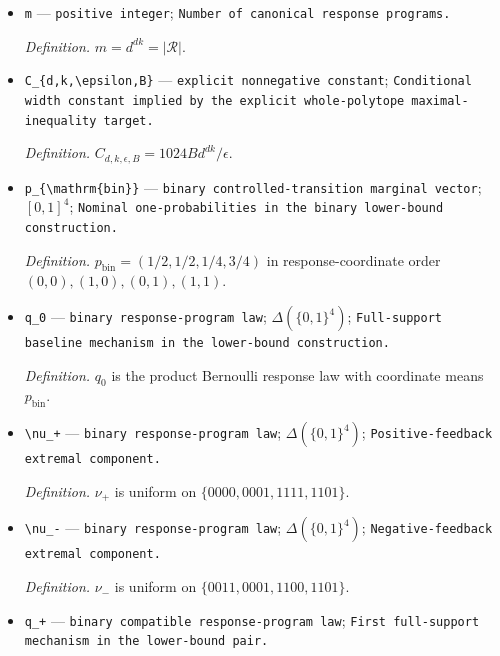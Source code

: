\documentclass{article}
\begin{document}
\begin{itemize}
  \item \texttt{m} --- \texttt{positive integer}; \texttt{Number of canonical response programs.}
  \par\smallskip\noindent\emph{Definition.} \(m=d^{dk}=|\mathcal R|\).
  \item \texttt{C\_\allowbreak{}\{d,\allowbreak{}k,\allowbreak{}\textbackslash{}\allowbreak{}epsilon,\allowbreak{}B\}\allowbreak{}} --- \texttt{explicit nonnegative constant}; \texttt{Conditional width constant implied by the explicit whole-\allowbreak{}polytope maximal-\allowbreak{}inequality target.}
  \par\smallskip\noindent\emph{Definition.} \(C_{d,k,\epsilon,B}=1024B d^{dk}/\epsilon\).
  \item \texttt{p\_\allowbreak{}\{\textbackslash{}\allowbreak{}mathrm\{bin\}\allowbreak{}\}\allowbreak{}} --- \texttt{binary controlled-\allowbreak{}transition marginal vector}; \([0,1]^4\); \texttt{Nominal one-\allowbreak{}probabilities in the binary lower-\allowbreak{}bound construction.}
  \par\smallskip\noindent\emph{Definition.} \(p_{\mathrm{bin}}=(1/2,1/2,1/4,3/4)\) in response-coordinate order \((0,0),(1,0),(0,1),(1,1)\).
  \item \texttt{q\_\allowbreak{}0} --- \texttt{binary response-\allowbreak{}program law}; \(\Delta(\{0,1\}^4)\); \texttt{Full-\allowbreak{}support baseline mechanism in the lower-\allowbreak{}bound construction.}
  \par\smallskip\noindent\emph{Definition.} \(q_0\) is the product Bernoulli response law with coordinate means \(p_{\mathrm{bin}}\).
  \item \texttt{\textbackslash{}\allowbreak{}nu\_\allowbreak{}+\allowbreak{}} --- \texttt{binary response-\allowbreak{}program law}; \(\Delta(\{0,1\}^4)\); \texttt{Positive-\allowbreak{}feedback extremal component.}
  \par\smallskip\noindent\emph{Definition.} \(\nu_+\) is uniform on \(\{0000,0001,1111,1101\}\).
  \item \texttt{\textbackslash{}\allowbreak{}nu\_\allowbreak{}-\allowbreak{}} --- \texttt{binary response-\allowbreak{}program law}; \(\Delta(\{0,1\}^4)\); \texttt{Negative-\allowbreak{}feedback extremal component.}
  \par\smallskip\noindent\emph{Definition.} \(\nu_-\) is uniform on \(\{0011,0001,1100,1101\}\).
  \item \texttt{q\_\allowbreak{}+\allowbreak{}} --- \texttt{binary compatible response-\allowbreak{}program law}; \texttt{First full-\allowbreak{}support mechanism in the lower-\allowbreak{}bound pair.}

\end{itemize}
\end{document}
